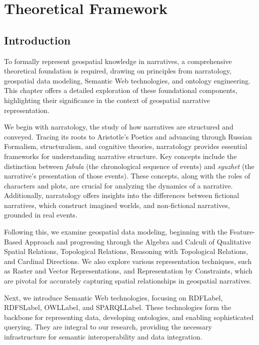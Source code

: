 \chapter{Theoretical Framework}\label{chap:theoretical_framework}

\section{Introduction}\label{II-sec:introduction}

To formally represent geospatial knowledge in narratives, a comprehensive theoretical foundation is required, drawing on principles from narratology, geospatial data modeling, Semantic Web technologies, and ontology engineering. This chapter offers a detailed exploration of these foundational components, highlighting their significance in the context of geospatial narrative representation.

We begin with narratology, the study of how narratives are structured and conveyed. Tracing its roots to Aristotle’s Poetics and advancing through Russian Formalism, structuralism, and cognitive theories, narratology provides essential frameworks for understanding narrative structure. Key concepts include the distinction between \textit{fabula} (the chronological sequence of events) and \textit{syuzhet} (the narrative's presentation of those events). These concepts, along with the roles of characters and plots, are crucial for analyzing the dynamics of a narrative. Additionally, narratology offers insights into the differences between fictional narratives, which construct imagined worlds, and non-fictional narratives, grounded in real events.

Following this, we examine geospatial data modeling, beginning with the Feature-Based Approach and progressing through the Algebra and Calculi of Qualitative Spatial Relations, Topological Relations, Reasoning with Topological Relations, and Cardinal Directions. We also explore various representation techniques, such as Raster and Vector Representations, and Representation by Constraints, which are pivotal for accurately capturing spatial relationships in geospatial narratives.

Next, we introduce Semantic Web technologies, focusing on \acrshort{RDFLabel}, \acrshort{RDFSLabel}, \acrshort{OWLLabel}, and \acrshort{SPARQLLabel}. These technologies form the backbone for representing data, developing ontologies, and enabling sophisticated querying. They are integral to our research, providing the necessary infrastructure for semantic interoperability and data integration.

